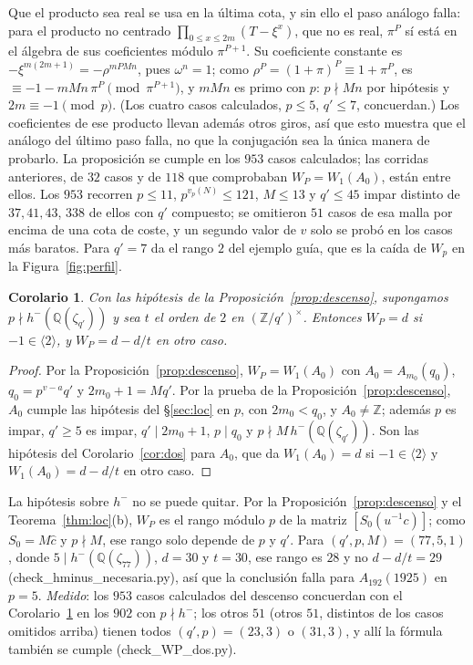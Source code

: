 \documentclass[11pt,a4paper]{article}
\newtheorem{corollary}[theorem]{Corolario}
\theoremstyle{definition}
\newcommand{\ZZ}{\mathbb{Z}}
\newcommand{\QQ}{\mathbb{Q}}
\begin{document}
\noindent Que el producto sea real se usa en la última cota, y sin ello el paso análogo falla: para el producto no centrado
$\prod_{0\le x\le 2m}(T-\xi^x)$, que no es real, $\pi^P$ sí está en el álgebra de sus coeficientes módulo $\pi^{P+1}$.
Su coeficiente constante es $-\xi^{m(2m+1)}=-\rho^{mPMn}$, pues $\omega^n=1$; como
$\rho^P=(1+\pi)^P\equiv1+\pi^P$, es $\equiv-1-mMn\,\pi^P\pmod{\pi^{P+1}}$, y $mMn$ es primo con $p$: $p\nmid Mn$
por hipótesis y $2m\equiv-1\pmod p$. (Los cuatro casos calculados, $p\le5$, $q'\le7$, concuerdan.) Los coeficientes
de ese producto llevan además otros giros, así que esto muestra que el análogo del último paso falla, no que la
conjugación sea la única manera de probarlo. La proposición se cumple en los $953$ casos calculados; las corridas
anteriores, de $32$ casos y de $118$ que comprobaban $W_P=W_1(A_0)$, están entre ellos. Los $953$ recorren $p\le11$, $p^{v_p(N)}\le121$, $M\le13$ y $q'\le45$ impar distinto de
$37,41,43$, $338$ de ellos con $q'$ compuesto; se omitieron $51$ casos de esa malla por encima de una cota de coste, y un
segundo valor de $v$ solo se probó en los casos más baratos. Para $q'=7$ da el
rango $2$ del ejemplo guía, que es la caída de $W_p$ en la Figura~\ref{fig:perfil}.

\begin{corollary}\label{cor:WPdos}
Con las hipótesis de la Proposición~\ref{prop:descenso}, supongamos $p\nmid h^-(\QQ(\zeta_{q'}))$ y sea $t$ el orden de
$2$ en $(\ZZ/q')^\times$. Entonces $W_P=d$ si $-1\in\langle2\rangle$, y $W_P=d-d/t$ en otro caso.
\end{corollary}

\begin{proof}
Por la Proposición~\ref{prop:descenso}, $W_P=W_1(A_0)$ con $A_0=A_{m_0}(q_0)$, $q_0=p^{v-a}q'$ y $2m_0+1=Mq'$.
Por la prueba de la
Proposición~\ref{prop:descenso}, $A_0$ cumple las hipótesis del \S\ref{sec:loc} en $p$, con $2m_0<q_0$, y
$A_0\ne\ZZ$; además $p$ es impar, $q'\ge5$ es impar, $q'\mid2m_0+1$, $p\mid q_0$ y $p\nmid M\,h^-(\QQ(\zeta_{q'}))$. Son las
hipótesis del Corolario~\ref{cor:dos} para $A_0$, que da $W_1(A_0)=d$ si $-1\in\langle2\rangle$ y $W_1(A_0)=d-d/t$ en
otro caso.
\end{proof}

\noindent La hipótesis sobre $h^-$ no se puede quitar. Por la Proposición~\ref{prop:descenso} y el
Teorema~\ref{thm:loc}(b), $W_P$ es el rango módulo $p$ de la matriz $[S_0(u^{-1}c)]$; como $S_0=M\hat c$ y $p\nmid M$, ese rango
solo depende de $p$ y $q'$. Para $(q',p,M)=(77,5,1)$, donde $5\mid h^-(\QQ(\zeta_{77}))$, $d=30$ y $t=30$, ese rango es $28$ y no $d-d/t=29$
({\ttfamily check\_hminus\_necesaria.py}), así que la conclusión falla para $A_{192}(1925)$ en $p=5$. \emph{Medido}:
los $953$ casos calculados del descenso concuerdan con el Corolario~\ref{cor:WPdos} en los $902$ con $p\nmid h^-$; los
otros $51$ (otros $51$, distintos de los casos omitidos arriba) tienen todos $(q',p)=(23,3)$ o $(31,3)$, y allí la fórmula también se cumple ({\ttfamily check\_WP\_dos.py}).
\end{document}
